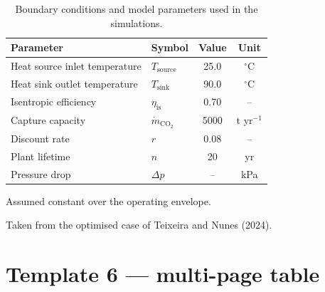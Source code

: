 \documentclass[11pt,a4paper]{article}
\begin{document}
\begin{table}[!htb]
  \centering
  \begin{threeparttable}
    \caption{Boundary conditions and model parameters used in the
             simulations.}
    \label{tab:parameters}
    \begin{tabular}{llcc}
      \toprule
      Parameter & Symbol & Value & Unit \\
      \midrule
      Heat source inlet temperature   & $T_\mathrm{source}$ & 25.0 & $^{\circ}$C \\
      Heat sink outlet temperature    & $T_\mathrm{sink}$   & 90.0 & $^{\circ}$C \\
      Isentropic efficiency\tnote{a}  & $\eta_\mathrm{is}$  & 0.70 & -- \\
      Capture capacity                & $\dot{m}_\mathrm{CO_2}$ & 5000 & t yr$^{-1}$ \\
      Discount rate\tnote{b}          & $r$                 & 0.08 & -- \\
      Plant lifetime                  & $n$                 & 20   & yr \\
      Pressure drop                   & $\Delta p$          & --   & kPa \\
      \bottomrule
    \end{tabular}
    \begin{tablenotes}[flushleft]\footnotesize
      \item[a] Assumed constant over the operating envelope.
      \item[b] Taken from the optimised case of Teixeira and Nunes (2024).
    \end{tablenotes}
  \end{threeparttable}
\end{table}

\section*{Template 6 --- multi-page table}
\end{document}

